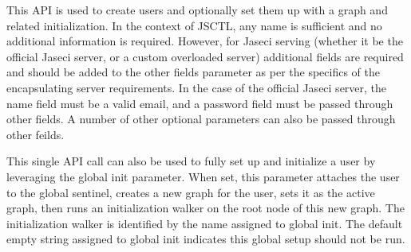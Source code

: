 {This API is used to create users and optionally set them up with a graph and
related initialization. In the context of
JSCTL, any name is sufficient and no additional information is required.
However, for Jaseci serving (whether it be the official Jaseci server, or a
custom overloaded server) additional fields are required and should be added
to the other fields parameter as per the specifics of the encapsulating server
requirements. In the case of the official Jaseci server, the name field must
be a valid email, and a password field must be passed through other fields.
A number of other optional parameters can also be passed through other feilds.
\vspace{3mm}\par
This single API call can also be used to fully set up and initialize a user
by leveraging the global init parameter. When set, this parameter attaches the
user to the global sentinel, creates a new graph for the user, sets it as the
active graph, then runs an initialization walker on the root node of this new
graph. The initialization walker is identified by the name assigned to
global init. The default empty string assigned to global init indicates this
global setup should not be run.\vspace{4mm}\par
{}}
